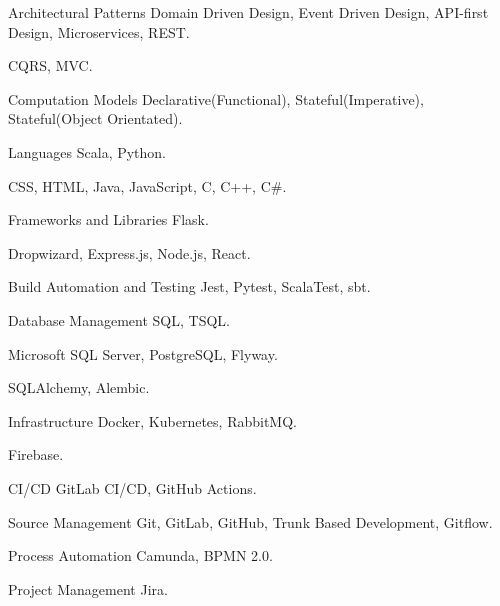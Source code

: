   \begin{cvskills}
    \cvskill
      {Architectural Patterns} 
      { Domain Driven Design, Event Driven Design, API-first Design, Microservices, REST.}
    
    \cvskill
      {} 
      { CQRS, MVC.}
    
    \cvskill
      {Computation Models} 
      { Declarative(Functional), Stateful(Imperative), Stateful(Object Orientated).} 
    
    \cvskill
      {Languages} 
      { Scala, Python.}
    
    \cvskill
      {} 
      { CSS, HTML, Java, JavaScript, C, C++, C\#.}
    
    \cvskill
      {Frameworks and Libraries} 
      { Flask.}
    
    \cvskill
      {} 
      { Dropwizard, Express.js, Node.js, React.}
    
    \cvskill
      {Build Automation and Testing} 
      { Jest, Pytest, ScalaTest, sbt.} 
    
    \cvskill
      {Database Management} 
      { SQL, TSQL.}
    
    \cvskill
      {} 
      { Microsoft SQL Server, PostgreSQL, Flyway.}
    
    \cvskill
      {} 
      { SQLAlchemy, Alembic.}
    
    \cvskill
      {Infrastructure} 
      { Docker, Kubernetes, RabbitMQ.} 
    
    \cvskill
      {} 
      { Firebase.} 
    
    \cvskill
      {CI/CD} 
      { GitLab CI/CD, GitHub Actions.} 
    
    \cvskill
      {Source Management} 
      { Git, GitLab, GitHub, Trunk Based Development, Gitflow.} 
    
    \cvskill
      {Process Automation}
      { Camunda, BPMN 2.0.}
    
    \cvskill
      {Project Management} 
      { Jira.} 
  \end{cvskills}